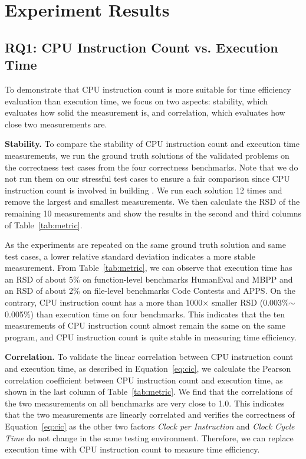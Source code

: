 \section{Experiment Results}\label{sec:eval}





\subsection{RQ1: CPU Instruction Count vs. Execution Time}

To demonstrate that CPU instruction count is more suitable for time efficiency evaluation than execution time, we focus on two aspects: stability, which evaluates how solid the measurement is, and correlation, which evaluates how close two measurements are.

\textbf{Stability.} To compare the stability of CPU instruction count and execution time measurements, we run the ground truth solutions of the validated problems on the correctness test cases from the four correctness benchmarks. Note that we do not run them on our stressful test cases to ensure a fair comparison since CPU instruction count is involved in building \bench. We run each solution 12 times and remove the largest and smallest measurements. We then calculate the RSD of the remaining 10 measurements and show the results in the second and third columns of Table~\ref{tab:metric}.

As the experiments are repeated on the same ground truth solution and same test cases, a lower relative standard deviation indicates a more stable measurement. From Table~\ref{tab:metric}, we can observe that execution time has an RSD of about 5\% on function-level benchmarks HumanEval and MBPP and an RSD of about 2\% on file-level benchmarks Code Contests and APPS. On the contrary, CPU instruction count has a more than 1000$\times$ smaller RSD (0.003\%$\sim$0.005\%) than execution time on four benchmarks. This indicates that the ten measurements of CPU instruction count almost remain the same on the same program, and CPU instruction count is quite stable in measuring time efficiency.

\textbf{Correlation.} To validate the linear correlation between CPU instruction count and execution time, as described in Equation~\ref{eq:cic}, we calculate the Pearson correlation coefficient between CPU instruction count and execution time, as shown in the last column of Table~\ref{tab:metric}. We find that the correlations of the two measurements on all benchmarks are very close to 1.0. This indicates that the two measurements are linearly correlated and verifies the correctness of Equation~\ref{eq:cic} as the other two factors \textit{Clock per Instruction} and \textit{Clock Cycle Time} do not change in the same testing environment. Therefore, we can replace execution time with CPU instruction count to measure time efficiency. 

